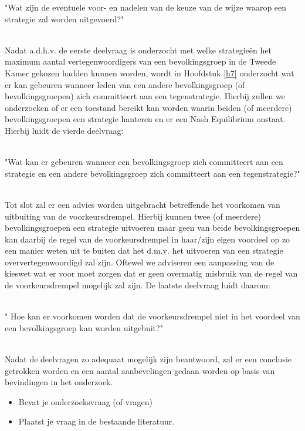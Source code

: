 \begin{SDV}"Wat zijn de eventuele voor- en nadelen van de keuze van de wijze waarop een strategie zal worden uitgevoerd?"\\\
\end{SDV}

Nadat a.d.h.v. de eerste deelvraag is onderzocht met welke strategie\"{e}n het maximum aantal vertegenwoordigers van een bevolkingsgroep in de Tweede Kamer gekozen hadden kunnen worden, wordt in Hoofdstuk \ref{h7} onderzocht wat er kan gebeuren wanneer leden van een andere bevolkingsgroep (of bevolkingsgroepen) zich committeert aan een tegenstrategie. Hierbij zullen we onderzoeken of er een toestand bereikt kan worden waarin beiden (of meerdere) bevolkingsgroepen een strategie hanteren en er een Nash Equilibrium onstaat. Hierbij luidt de vierde deelvraag: \\\

\begin{DV}"Wat kan er gebeuren wanneer een bevolkingsgroep zich committeert aan een strategie en een andere bevolkingsgroep zich committeert aan een tegenstrategie?"\\\
\end{DV}

Tot slot zal er een advies worden uitgebracht betreffende het voorkomen van uitbuiting van de voorkeursdrempel. Hierbij kunnen twee (of meerdere) bevolkingsgroepen een strategie uitvoeren maar geen van beide bevolkingsgroepen kan daarbij de regel van de voorkeursdrempel in haar/zijn eigen voordeel op zo een manier weten uit te buiten dat het d.m.v. het uitvoeren van een strategie oververtegenwoordigd zal zijn. Oftewel we adviseren een aanpassing van de kieswet wat er voor moet zorgen dat er geen overmatig misbruik van de regel van de voorkeursdrempel mogelijk zal zijn. De laatste deelvraag luidt daarom: \\\

\begin{DV}" Hoe kan er voorkomen worden dat de voorkeursdrempel niet in het voordeel van een bevolkingsgroep kan worden uitgebuit?"\\\
\end{DV}

Nadat de deelvragen zo adequaat mogelijk zijn beantwoord, zal er een conclusie getrokken worden en een aantal aanbevelingen gedaan worden op basis van bevindingen in het onderzoek. 






\iffalse
\begin{itemize}
\item Bevat je onderzoeksvraag (of vragen)
\item Plaatst je vraag in de bestaande literatuur.
\end{itemize}

